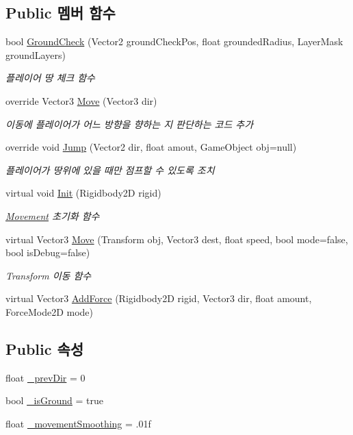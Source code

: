\subsection*{Public 멤버 함수}
\begin{DoxyCompactItemize}
\item 
bool \mbox{\hyperlink{class_player_movement_a957f2e09268831052dbd00a9e8e4fa70}{Ground\+Check}} (Vector2 ground\+Check\+Pos, float grounded\+Radius, Layer\+Mask ground\+Layers)
\begin{DoxyCompactList}\small\item\em 플레이어 땅 체크 함수 \end{DoxyCompactList}\item 
override Vector3 \mbox{\hyperlink{class_player_movement_a94c480a9aa5629d78b5fd16d9a814bb7}{Move}} (Vector3 dir)
\begin{DoxyCompactList}\small\item\em 이동에 플레이어가 어느 방향을 향하는 지 판단하는 코드 추가 \end{DoxyCompactList}\item 
override void \mbox{\hyperlink{class_player_movement_a64ce92029a6d91f12d23332bdd44a6ab}{Jump}} (Vector2 dir, float amout, Game\+Object obj=null)
\begin{DoxyCompactList}\small\item\em 플레이어가 땅위에 있을 때만 점프할 수 있도록 조치 \end{DoxyCompactList}\item 
virtual void \mbox{\hyperlink{class_movement_a1c50c07edbe274e1cf55253e87506684}{Init}} (Rigidbody2D rigid)
\begin{DoxyCompactList}\small\item\em \mbox{\hyperlink{class_movement}{Movement}} 초기화 함수 \end{DoxyCompactList}\item 
virtual Vector3 \mbox{\hyperlink{class_movement_ad400f155e0556a5e22a74cb77858460a}{Move}} (Transform obj, Vector3 dest, float speed, bool mode=false, bool is\+Debug=false)
\begin{DoxyCompactList}\small\item\em Transform 이동 함수 \end{DoxyCompactList}\item 
virtual Vector3 \mbox{\hyperlink{class_movement_ab0b20a2f058e2eed15f4bdf0503a2566}{Add\+Force}} (Rigidbody2D rigid, Vector3 dir, float amount, Force\+Mode2D mode)
\end{DoxyCompactItemize}
\subsection*{Public 속성}
\begin{DoxyCompactItemize}
\item 
float \mbox{\hyperlink{class_player_movement_a802b794d028125d4e547a9caeb90d3d4}{\+\_\+prev\+Dir}} = 0
\item 
bool \mbox{\hyperlink{class_player_movement_a3096725f76488ebfdc761c53e9fac852}{\+\_\+is\+Ground}} = true
\item 
float \mbox{\hyperlink{class_movement_aff7ca49ff5d930ac7345da97a5162e3a}{\+\_\+movement\+Smoothing}} = .\+01f
\end{DoxyCompactItemize}
